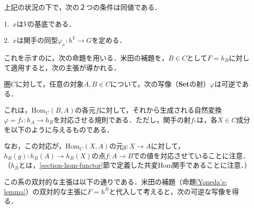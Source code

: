 \documentclass[uplatex, dvipdfmx]{jsreport}
\begin{document}
\begin{proposition}[線型空間の基底の圏論的特徴付け]\rm{}\label{prop-charactorization-base}
    上記の状況の下で，次の２つの条件は同値である．

    1.\, $x$は$V$の基底である．

    2.\, $x$は関手の同型$\varphi_x :h^V\to G$を定める．
\end{proposition}
これを示すのに，次の命題を用いる．米田の補題を，$B\in C$として$F=h_B$に対して適用すると，次の主張が導かれる．
\begin{shadebox}\begin{corollary} \label{Yoneda's-lemma-1}\rm{}
    圏$C$に対して，任意の対象$A,B\in C$について，次の写像（\textbf{Set}の射）$\varphi$は可逆である．
    \begin{center}\end{center}
    これは，$\mathrm{Hom}_C(B,A) $の各元$f$に対して，それから生成される自然変換$\varphi=f_*:h_A\to h_B$を対応させる規則である．ただし，関手の射$f_*$は，各$X\in C$成分を以下のように与えるものである．
    \begin{center}\end{center}
    なお，この対応が，$\mathrm{Hom}_C(X,A)$の元$g:X\to A$に対して，$h_B(g):h_B(A)\to h_B(X)$の点$f:A\to B$での値を対応させていることに注意．（$h_B$とは，\ref{section-hom-functor}節で定義した共変Hom関手であることに注意．）
\end{corollary}\end{shadebox}
\begin{remark}\rm{}
    この系の双対的な主張は以下の通りである．米田の補題（命題\ref{Yoneda's-lemma}）の双対的な主張に$F=h^B$と代入して考えると，次の可逆な写像を得る．
    \begin{center}\end{center}
\end{remark}
\end{document}
